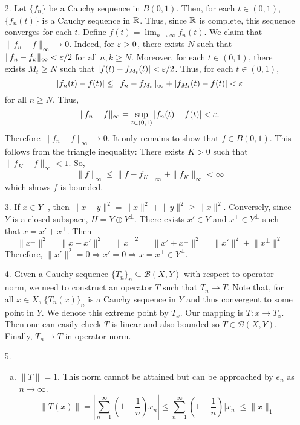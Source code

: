 \begin{itemize}
		\item[2.] %
		Let $\{f_n\}$ be a Cauchy sequence in $B(0,1)$. Then, for each $t \in (0,1)$, $\{f_n(t)\}$ is a Cauchy sequence in $\mathbb{R}$. Thus, since $\mathbb{R}$ is complete, this sequence converges for each $t$. Define $f(t) = \lim_{n \to \infty} f_n(t)$. We claim that $\|f_n-f\|_\infty \to 0$. Indeed, for $\varepsilon >0$, there exists $N$ such that $\|f_n-f_k\|_\infty < \varepsilon /2$ for all $n,k \ge N$. Moreover, for each $t \in 
(0,1)$, there exists $M_t \ge N$ such that $|f(t)-f_{M_t}(t)| < \varepsilon/2$. Thus, for each $t \in (0,1)$,
			\[ |f_n(t)-f(t)| \le \|f_n-f_{M_t}\|_\infty + |f_{M_t}(t)-f(t)| < \varepsilon \]
		for all $n \ge N$. Thus,
			\[ \|f_n-f\|_\infty = \sup_{t \in (0,1)} |f_n(t)-f(t)| < \varepsilon. \]
		Therefore $\|f_n-f\|_\infty \to 0$. It only remains to show that $f \in B(0,1)$. This follows from the triangle inequality: There exists $K>0$ such that $\|f_K-f\|_\infty < 1$. So,
			\[ \|f\|_\infty \le \|f-f_K\|_\infty + \|f_K\|_\infty < \infty \]
		which shows $f$ is bounded.
		\item[3.] If $x\in Y^\perp$, then $\lVert x-y\rVert^2 = \lVert x\rVert^2 +  \lVert y\rVert^2 \ge \lVert x\rVert^2$. Conversely, since $Y$ is a closed subspace, $H= Y\oplus Y^\perp$. There exists $x' \in Y$ and $x^\perp \in Y^\perp$ such that $x = x'+x^\perp$. Then 
		$$
		\lVert x^\perp \rVert^2=\lVert x - x'\rVert^2 = \lVert x\rVert^2 = \lVert  x'+x^\perp\rVert^2 =  \lVert x'\rVert^2+\lVert x^\perp\rVert^2
		$$
		Therefore, $\lVert x'\rVert^2 = 0 \Rightarrow x' = 0 \Rightarrow x= x^\perp \in Y^\perp$.
		
		\item[4.]  Given a Cauchy sequence $\{T_n\}_n\subseteq \mathcal{B}(X,Y)$ with respect to operator norm, we need to construct an operator $T$ such that $T_n\rightarrow T$. Note that, for all $x\in X$, $\{T_n(x)\}_n$ is a Cauchy sequence in $Y$ and thus convergent to some point in $Y$. We denote this extreme point by $T_x$. Our mapping is $T: x\rightarrow T_x$. Then one can easily check $T$ is linear and also bounded so $T\in \mathcal{B}(X,Y)$. Finally, $T_n\rightarrow T$ in operator norm. 
		
		\item[5.] \begin{enumerate}[(a)]
			\item $\lVert T\rVert  =1$. This norm cannot be attained but can be approached by $e_n$ as $n\rightarrow \infty$.
			$$
			\left\lVert T(x) \right\rVert = \left\lvert \sum_{n=1}^\infty \left(1-\frac{1}{n}\right)x_n  \right\rvert \le  \sum_{n=1}^\infty \left(1-\frac{1}{n}\right) \left\lvert  x_n  \right\rvert  \le \lVert x\rVert_1
			$$
			

\end{enumerate}
\end{itemize}
